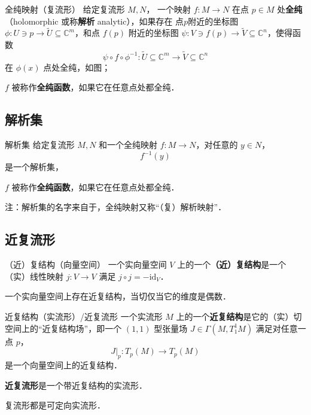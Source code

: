 \begin{definition}{全纯映射（复流形）}
给定复流形 $M, N$， 一个映射 $f: M \to N$ 在点 $p \in M$ 处\textbf{全纯}（holomorphic 或称\textbf{解析} analytic），如果存在 点$p$附近的坐标图 $\phi: U \ni p \to \tilde{U} \subseteq \mathbb{C}^m$，和点 $f(p)$ 附近的坐标图 $\psi: V \ni f(p) \to \tilde{V} \subseteq \mathbb{C}^n$，使得函数
$$
\psi \circ f \circ \phi^{-1}: \tilde{U} \subseteq \mathbb{C}^m \to \tilde{V} \subseteq \mathbb{C}^n
$$
在 $\phi(x)$ 点处全纯，如图；

$f$ 被称作\textbf{全纯函数}，如果它在任意点处都全纯．
\end{definition}



\subsection{解析集}

\begin{definition}{解析集}
给定复流形 $M, N$ 和一个全纯映射 $f: M \to N$，对任意的 $y \in N$，
$$
f^{-1}(y)
$$
是一个解析集，

$f$ 被称作\textbf{全纯函数}，如果它在任意点处都全纯．
\end{definition}
注：解析集的名字来自于，全纯映射又称“（复）解析映射”．



\subsection{近复流形}

\begin{definition}{（近）复结构（向量空间）}
一个实向量空间 $V$ 上的一个\textbf{（近）复结构}是一个（实）线性映射 $j: V \to V$ 满足 $j \circ j = - \text{id}_V$．
\end{definition}

\begin{theorem}{}
一个实向量空间上存在近复结构，当切仅当它的维度是偶数．
\end{theorem}

\begin{definition}{近复结构（实流形）/近复流形}
一个实流形 $M$ 上的一个\textbf{近复结构}是它的（实）切空间上的“近复结构场”，即一个 $(1, 1)$ 型张量场 $J \in \Gamma(M, T_1^1 M)$ 满足对任意一点 $p$， 
$$
J|_p: T_p(M) \to T_p(M)
$$
是一个向量空间上的近复结构．

\textbf{近复流形}是一个带近复结构的实流形．
\end{definition}

\begin{theorem}{}
复流形都是可定向实流形．
\end{theorem}





